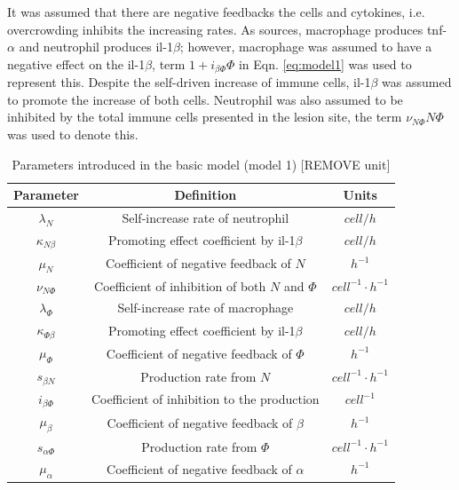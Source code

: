 It was assumed that there are negative feedbacks the cells and cytokines, i.e. overcrowding inhibits the increasing rates. As sources, macrophage produces tnf-$\alpha$ and neutrophil produces il-1$\beta$; however, macrophage was assumed to have a negative effect on the il-1$\beta$, term $1+i_{\beta\Phi}\Phi$ in Eqn. \ref{eq:model1} was used to represent this. Despite the self-driven increase of immune cells, il-1$\beta$ was assumed to promote the increase of both cells. Neutrophil was also assumed to be inhibited by the total immune cells presented in the lesion site, the term $\nu_{N\Phi}N\Phi$ was used to denote this.

\begin{table}[t]
    \centering
    \begin{tabular}{|c c c|}
        \hline
        Parameter            & Definition                                       & Units                    \\ [0.5ex]
        \hline\hline
        $\lambda_N$          & Self-increase rate of neutrophil                 & $cell/h$                 \\
        $\kappa_{N\beta}$    & Promoting effect coefficient by il-1$\beta$      & $cell/h$                 \\
        $\mu_N$              & Coefficient of negative feedback of $N$          & $h^{-1}$                 \\
        $\nu_{N\Phi}$        & Coefficient of inhibition of both $N$ and $\Phi$ & $cell^{-1}\cdotp h^{-1}$ \\
        \hline
        $\lambda_\Phi$       & Self-increase rate of macrophage                 & $cell/h$                 \\
        $\kappa_{\Phi\beta}$ & Promoting effect coefficient by il-1$\beta$      & $cell/h$                 \\
        $\mu_\Phi$           & Coefficient of negative feedback of $\Phi$       & $h^{-1}$                 \\
        \hline
        $s_{\beta N}$        & Production rate from $N$                         & $cell^{-1}\cdotp h^{-1}$ \\
        $i_{\beta\Phi}$      & Coefficient of inhibition to the production      & $cell^{-1}$              \\
        $\mu_\beta$          & Coefficient of negative feedback of $\beta$      & $h^{-1}$                 \\
        \hline
        $s_{\alpha\Phi}$     & Production rate from $\Phi$                      & $cell^{-1}\cdotp h^{-1}$ \\
        $\mu_\alpha$         & Coefficient of negative feedback of $\alpha$     & $h^{-1}$                 \\
        \hline
    \end{tabular}
    \caption{Parameters introduced in the basic model (model 1) [REMOVE unit]}
    \label{table:m1}
\end{table}

